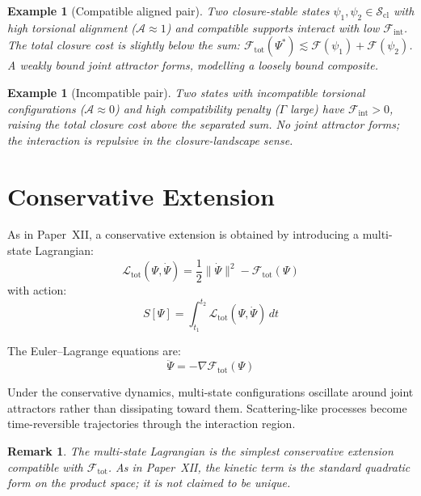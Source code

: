 \documentclass[12pt]{article}
\newtheorem{remark}[theorem]{Remark}
\newtheorem{example}[theorem]{Example}
\newcommand{\Fcal}{\mathcal{F}}
\newcommand{\Lcal}{\mathcal{L}}
\newcommand{\Scl}{\mathcal{S}_{\mathrm{cl}}}
\newcommand{\Fint}{\Fcal_{\mathrm{int}}}
\newcommand{\Ftot}{\Fcal_{\mathrm{tot}}}
\begin{document}
\begin{example}[Compatible aligned pair]\label{ex:aligned}
Two closure-stable states $\psi_1, \psi_2 \in \Scl$ with high torsional alignment ($\mathcal{A} \approx 1$) and compatible supports interact with low $\Fint$. The total closure cost is slightly below the sum: $\Ftot(\Psi^*) \lesssim \Fcal(\psi_1) + \Fcal(\psi_2)$. A weakly bound joint attractor forms, modelling a loosely bound composite.
\end{example}

\begin{example}[Incompatible pair]\label{ex:repulsive}
Two states with incompatible torsional configurations ($\mathcal{A} \approx 0$) and high compatibility penalty ($\Gamma$ large) have $\Fint > 0$, raising the total closure cost above the separated sum. No joint attractor forms; the interaction is repulsive in the closure-landscape sense.
\end{example}

\section{Conservative Extension}\label{sec:lagrangian}

As in Paper~XII, a conservative extension is obtained by introducing a multi-state Lagrangian:
\begin{equation}\label{eq:lagrangian}
    \Lcal_{\mathrm{tot}}(\Psi, \dot{\Psi}) = \frac{1}{2}\|\dot{\Psi}\|^2 - \Ftot(\Psi)
\end{equation}
with action:
\begin{equation}
    S[\Psi] = \int_{t_1}^{t_2} \Lcal_{\mathrm{tot}}(\Psi, \dot{\Psi})\, dt
\end{equation}

The Euler--Lagrange equations are:
\begin{equation}\label{eq:EL}
    \ddot{\Psi} = -\nabla\Ftot(\Psi)
\end{equation}

Under the conservative dynamics, multi-state configurations oscillate around joint attractors rather than dissipating toward them. Scattering-like processes become time-reversible trajectories through the interaction region.

\begin{remark}
The multi-state Lagrangian is the simplest conservative extension compatible with $\Ftot$. As in Paper~XII, the kinetic term is the standard quadratic form on the product space; it is not claimed to be unique.
\end{remark}
\end{document}
